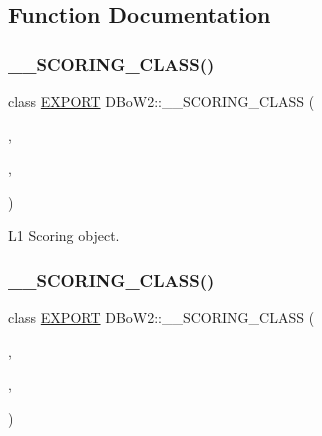 \subsection{Function Documentation}
\mbox{\label{namespace_d_bo_w2_a366d1d4a75ab8276e171af0aaa04b29b}} 
\subsubsection{\texorpdfstring{\+\_\+\+\_\+\+S\+C\+O\+R\+I\+N\+G\+\_\+\+C\+L\+A\+S\+S()}{\_\_SCORING\_CLASS()}\hspace{0.1cm}{\footnotesize\ttfamily [1/6]}}
{\footnotesize\ttfamily class \mbox{\hyperlink{_d_bo_w2_2_d_utils_2config_8h_a3472d8cdbb788d5f1815b3522595bc49}{E\+X\+P\+O\+RT}} D\+Bo\+W2\+::\+\_\+\+\_\+\+S\+C\+O\+R\+I\+N\+G\+\_\+\+C\+L\+A\+SS (\begin{DoxyParamCaption}\item[{L1\+Scoring}]{,  }\item[{true}]{,  }\item[{\mbox{\hyperlink{namespace_d_bo_w2_a53e9e0bcfc25c861815e413a7cf3fa51a94f5879ff083c0a8364805ae4f9c2d5c}{L1}}}]{ }\end{DoxyParamCaption})}



L1 Scoring object. 

\mbox{\label{namespace_d_bo_w2_a38216a543c4968d22bf2ffd2178e299c}} 
\subsubsection{\texorpdfstring{\+\_\+\+\_\+\+S\+C\+O\+R\+I\+N\+G\+\_\+\+C\+L\+A\+S\+S()}{\_\_SCORING\_CLASS()}\hspace{0.1cm}{\footnotesize\ttfamily [2/6]}}
{\footnotesize\ttfamily class \mbox{\hyperlink{_d_bo_w2_2_d_utils_2config_8h_a3472d8cdbb788d5f1815b3522595bc49}{E\+X\+P\+O\+RT}} D\+Bo\+W2\+::\+\_\+\+\_\+\+S\+C\+O\+R\+I\+N\+G\+\_\+\+C\+L\+A\+SS (\begin{DoxyParamCaption}\item[{L2\+Scoring}]{,  }\item[{true}]{,  }\item[{\mbox{\hyperlink{namespace_d_bo_w2_a53e9e0bcfc25c861815e413a7cf3fa51aff96c9503798aa8504a954d3832e5eaa}{L2}}}]{ }\end{DoxyParamCaption})}



